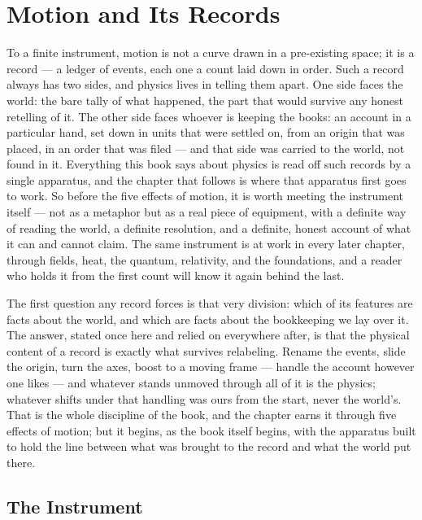 \chapter{Motion and Its Records}
\label{chap:motion-and-its-records}

To a finite instrument, motion is not a curve drawn in a pre-existing space; it is a record --- a ledger of
events, each one a count laid down in order. Such a record always has two sides, and physics lives in telling
them apart. One side faces the world: the bare tally of what happened, the part that would survive any honest
retelling of it. The other side faces whoever is keeping the books: an account in a particular hand, set down
in units that were settled on, from an origin that was placed, in an order that was filed --- and that side
was carried to the world, not found in it. Everything this book says about physics is read off such records by
a single apparatus, and the chapter that follows is where that apparatus first goes to work. So before the
five effects of motion, it is worth meeting the instrument itself --- not as a metaphor but as a real piece of
equipment, with a definite way of reading the world, a definite resolution, and a definite, honest account of
what it can and cannot claim. The same instrument is at work in every later chapter, through fields, heat, the
quantum, relativity, and the foundations, and a reader who holds it from the first count will know it again
behind the last.

The first question any record forces is that very division: which of its features are facts about the world,
and which are facts about the bookkeeping we lay over it. The answer, stated once here and relied on everywhere
after, is that the physical content of a record is exactly what survives relabeling. Rename the events, slide
the origin, turn the axes, boost to a moving frame --- handle the account however one likes --- and whatever
stands unmoved through all of it is the physics; whatever shifts under that handling was ours from the start,
never the world's. That is the whole discipline of the book, and the chapter earns it through five effects of
motion; but it begins, as the book itself begins, with the apparatus built to hold the line between what was
brought to the record and what the world put there.

\section{The Instrument}
\label{se:the-instrument}

